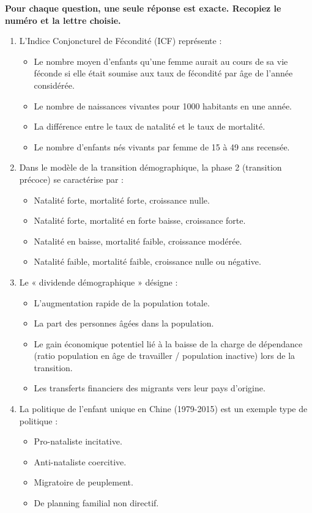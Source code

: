 \documentclass[11pt]{article}
\begin{document}
\begin{exercice}
\textbf{Pour chaque question, une seule réponse est exacte. Recopiez le numéro et la lettre choisie.}
\begin{enumerate}
    \item L'Indice Conjoncturel de Fécondité (ICF) représente :
    \begin{itemize}
        \item[A.] Le nombre moyen d'enfants qu'une femme aurait au cours de sa vie féconde si elle était soumise aux taux de fécondité par âge de l'année considérée.
        \item[B.] Le nombre de naissances vivantes pour 1000 habitants en une année.
        \item[C.] La différence entre le taux de natalité et le taux de mortalité.
        \item[D.] Le nombre d'enfants nés vivants par femme de 15 à 49 ans recensée.
    \end{itemize}
    \item Dans le modèle de la transition démographique, la phase 2 (transition précoce) se caractérise par :
    \begin{itemize}
        \item[A.] Natalité forte, mortalité forte, croissance nulle.
        \item[B.] Natalité forte, mortalité en forte baisse, croissance forte.
        \item[C.] Natalité en baisse, mortalité faible, croissance modérée.
        \item[D.] Natalité faible, mortalité faible, croissance nulle ou négative.
    \end{itemize}
    \item Le « dividende démographique » désigne :
    \begin{itemize}
        \item[A.] L'augmentation rapide de la population totale.
        \item[B.] La part des personnes âgées dans la population.
        \item[C.] Le gain économique potentiel lié à la baisse de la charge de dépendance (ratio population en âge de travailler / population inactive) lors de la transition.
        \item[D.] Les transferts financiers des migrants vers leur pays d'origine.
    \end{itemize}
    \item La politique de l'enfant unique en Chine (1979-2015) est un exemple type de politique :
    \begin{itemize}
        \item[A.] Pro-nataliste incitative.
        \item[B.] Anti-nataliste coercitive.
        \item[C.] Migratoire de peuplement.
        \item[D.] De planning familial non directif.
    \end{itemize}
\end{enumerate}
\end{exercice}
\end{document}
